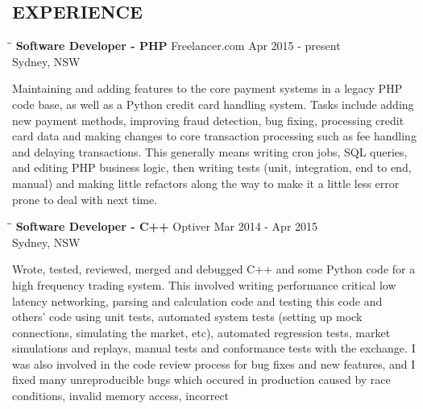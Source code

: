 \documentclass{res}
\begin{document}
\begin{resume}
\section{EXPERIENCE}
   \vspace{-0.1in}	
   \begin{tabbing}
   \hspace{2.3in}\= \hspace{2.6in}\= \kill %
    {\bf Software Developer - PHP} \>Freelancer.com \>Apr 2015 - present\\
                                   \>Sydney, NSW
   \end{tabbing}\vspace{-20pt}      %
    Maintaining and adding features to the core payment systems in a legacy
    PHP code base, as well as a Python credit card handling system. Tasks
    include adding new payment methods, improving fraud detection, bug fixing,
    processing credit card data and making changes to core transaction
    processing such as fee handling and delaying transactions. This generally
    means writing cron jobs, SQL queries, and editing PHP business logic, then
    writing tests (unit, integration, end to end, manual) and making little
    refactors along the way to make it a little less error prone to deal with
    next time.
   \begin{tabbing}
   \hspace{2.3in}\= \hspace{2.6in}\= \kill %
    {\bf Software Developer - C++} \>Optiver \>Mar 2014 - Apr 2015\\
                                   \>Sydney, NSW
   \end{tabbing}\vspace{-20pt}      %
    Wrote, tested, reviewed, merged and debugged C++ and some Python code for a
    high frequency trading system. This involved writing performance critical
    low latency networking, parsing and calculation code and testing this code
    and others' code using unit tests, automated system tests (setting up mock
    connections, simulating the market, etc), automated regression tests,
    market simulations and replays, manual tests and conformance tests with the
    exchange. I was also involved in the code review process for bug fixes and
    new features, and I fixed many unreproducible bugs which occured in
    production caused by race conditions, invalid memory access, incorrect

\end{resume}
\end{document}
